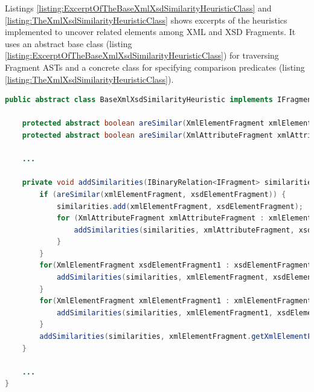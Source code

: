 Listings \ref{listing:ExcerptOfTheBaseXmlXsdSimilarityHeuristicClass} and \ref{listing:TheXmlXsdSimilarityHeuristicClass} shows excerpts of the heuristics implemented to uncover related elements among \gls{XML} and \gls{XSD} \glspl{Fragment}.
It uses an abstract base class (listing \ref{listing:ExcerptOfTheBaseXmlXsdSimilarityHeuristicClass}) for traversing \gls{Fragment} \glspl{AST} and a concrete class for specifying comparison predicates (listing \ref{listing:TheXmlXsdSimilarityHeuristicClass}).
\begin{lstlisting}[language=Java,caption={Excerpt of the BaseXmlXsdSimilarityHeuristic class},label={listing:ExcerptOfTheBaseXmlXsdSimilarityHeuristicClass}]
public abstract class BaseXmlXsdSimilarityHeuristic implements IFragmentAnalyzerHeuristic {

    protected abstract boolean areSimilar(XmlElementFragment xmlElementFragment, XmlElementFragment xsdElementFragment);
    protected abstract boolean areSimilar(XmlAttributeFragment xmlAttributeFragment, XmlElementFragment xsdElementFragment);

    ...

    private void addSimilarities(IBinaryRelation<IFragment> similarities, XmlElementFragment xmlElementFragment, XmlElementFragment xsdElementFragment) {
        if (areSimilar(xmlElementFragment, xsdElementFragment)) {
            similarities.add(xmlElementFragment, xsdElementFragment);
            for (XmlAttributeFragment xmlAttributeFragment : xmlElementFragment.getXmlAttributeFragments()) {
                addSimilarities(similarities, xmlAttributeFragment, xsdElementFragment.getXmlElementFragments());
            }
        }
        for(XmlElementFragment xsdElementFragment1 : xsdElementFragment.getXmlElementFragments()) {
            addSimilarities(similarities, xmlElementFragment, xsdElementFragment1);
        }
        for(XmlElementFragment xmlElementFragment1 : xmlElementFragment.getXmlElementFragments()) {
            addSimilarities(similarities, xmlElementFragment1, xsdElementFragment);
        }
        addSimilarities(similarities, xmlElementFragment.getXmlElementFragments(), xsdElementFragment.getXmlElementFragments());
    }

    ...
}
\end{lstlisting}

